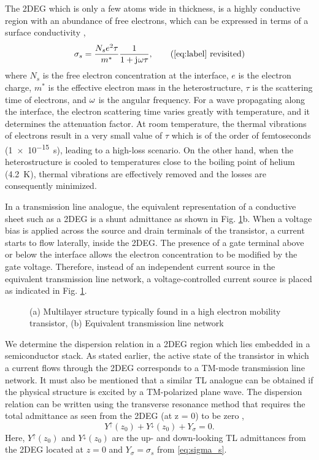 The 2DEG which is only a few atoms wide in thickness, is a highly conductive region with an abundance of free electrons, which can be expressed in terms of a surface conductivity \cite{Burke2000},
%
\begin{equation}
  \sigma_s = \frac{N_s e^2 \tau}{m^{\ast}}\frac{1}{1 + \j \O \tau},
  \tag{\ref{eq:label} revisited} \label{eq:sigma_s}
\end{equation}
%
where $N_s$ is the free electron concentration at the interface, $e$ is the electron charge, $m^{\ast}$ is the effective electron mass in the heterostructure, $\tau$ is the scattering time of electrons, and $\omega$ is the angular frequency. For a wave propagating along the interface, the electron scattering time varies greatly with temperature, and it determines the attenuation factor. At room temperature, the thermal vibrations of electrons result in a very small value of $\tau$ which is of the order of femtoseconds (\SI{1e-15}{\s}), leading to a high-loss scenario. On the other hand, when the heterostructure is cooled to temperatures close to the boiling point of helium (\SI[round-precision=2]{4.2}{\kelvin}), thermal vibrations are effectively removed and the losses are consequently minimized.

In a transmission line analogue, the equivalent representation of a conductive sheet such as a 2DEG is a shunt admittance as shown in Fig. \ref{fig:TL_equivalent}b. When a voltage bias is applied across the source and drain terminals of the transistor, a current starts to flow laterally, inside the 2DEG. The presence of a gate terminal above or below the interface allows the electron concentration to be modified by the gate voltage. Therefore, instead of an independent current source in the equivalent transmission line network, a voltage-controlled current source is placed as indicated in Fig. \ref{fig:TL_equivalent}.
%
\begin{figure}[t!]
  \centering
  \def\svgwidth{\linewidth}
  
  \caption{(a) Multilayer structure typically found in a high electron mobility transistor, (b) Equivalent transmission line network}
  \label{fig:TL_equivalent}
\end{figure}
%

We determine the dispersion relation in a 2DEG region which lies embedded in a semiconductor stack. As stated earlier, the active state of the transistor in which a current flows through the 2DEG corresponds to a TM-mode transmission line network. It must also be mentioned that a similar TL analogue can be obtained if the physical structure is excited by a TM-polarized plane wave. The dispersion relation can be written using the transverse resonance method that requires the total admittance as seen from the 2DEG (at z = 0) to be zero \cite{Felsen1994,Gomez-Diaz2012},
%
\begin{equation}
  Y^{\uparrow}(z_0) + Y^{\downarrow}(z_0) + Y_{\sigma} = 0.
  \label{eq:dispersion}
\end{equation}
%
Here, $Y^{\uparrow}(z_0)$ and $Y^{\downarrow}(z_0)$ are the up- and down-looking TL admittances from the 2DEG located at $z = 0$ and $Y_{\sigma} = \sigma_s$ from \eqref{eq:sigma_s}.

